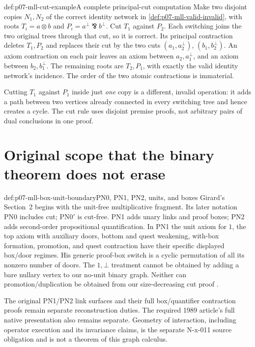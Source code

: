 \begin{hbexample}{def:p07-mll-cut-example}{A complete principal-cut computation}
Make two disjoint copies \(N_1,N_2\) of the correct identity network
in \cref{def:p07-mll-valid-invalid}, with roots \(T_i=a\otimes b\)
and \(P_i=a^\perp\bindnasrepma b^\perp\).
Cut \(T_1\) against \(P_2\). Each switching joins the two original
trees through that cut, so it is correct. Its principal contraction
deletes \(T_1,P_2\) and replaces their cut by the two cuts
\((a_1,a_2^\perp)\), \((b_1,b_2^\perp)\).
An axiom contraction on each pair leaves an axiom between
\(a_2,a_1^\perp\), and an axiom between \(b_2,b_1^\perp\).
The remaining roots are \(T_2,P_1\), with exactly the valid identity
network's incidence. The order of the two atomic contractions is immaterial.

Cutting \(T_1\) against \(P_1\) inside just \emph{one} copy is a
different, invalid operation: it adds a path between two vertices already
connected in every switching tree and hence creates a cycle.
The cut rule uses disjoint premise proofs, not arbitrary pairs of
dual conclusions in one proof.
\end{hbexample}

\section{Original scope that the binary theorem does not erase}
\label{sec:p07-mll-source-boundaries}

\begin{proofboundary}{def:p07-mll-box-unit-boundary}{PN0, PN1, PN2, units, and boxes}
Girard's Section~2 begins with the unit-free multiplicative fragment.
Its later notation PN0 includes cut; \(\mathrm{PN0}'\) is cut-free.
PN1 adds unary links and proof boxes; PN2 adds second-order
propositional quantification. In PN1 the unit axiom for \(1\), the
top axiom with auxiliary doors, bottom and quest weakening,
with-box formation, promotion, and quest contraction have their
specific displayed box/door regimes. His generic proof-box switch
is a cyclic permutation of all its nonzero number of doors.
The \(1,\bot\) treatment cannot be obtained by adding a bare nullary
vertex to our no-unit binary graph. Neither can promotion/duplication
be obtained from our size-decreasing cut proof
\cite[pp.~43--47]{Girard1987AuthorHosted}.

The original PN1/PN2 link surfaces and their full box/quantifier
contraction proofs remain separate reconstruction duties. The required
1989 article's full native presentation also remains separate.
Geometry of interaction, including operator execution and its
invariance claims, is the separate N-x-011 source obligation and is not
a theorem of this graph calculus.
\end{proofboundary}

